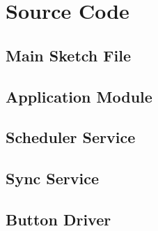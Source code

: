 \appendix
\section{Source Code}

\subsection{Main Sketch File}


\subsection{Application Module}




\subsection{Scheduler Service}




\subsection{Sync Service}




\subsection{Button Driver}




